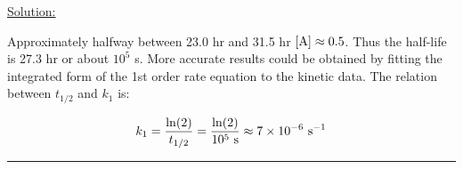 \noindent
\underline{Solution:}

Approximately halfway between 23.0 hr and 31.5 hr $\left[\textnormal{A}\right]\approx 0.5$. Thus the half-life is 27.3 hr or about $10^5$ s. More accurate results could be obtained by fitting the integrated form of the 1st order rate equation to the kinetic data. The relation between $t_{1/2}$ and $k_1$ is:

$$k_1 = \frac{\ln(2)}{t_{1/2}} = \frac{\ln(2)}{10^5\textnormal{ s}} \approx 7\times 10^{-6}\textnormal{ s}^{-1}$$

\hrule\vspace{0.5cm}
